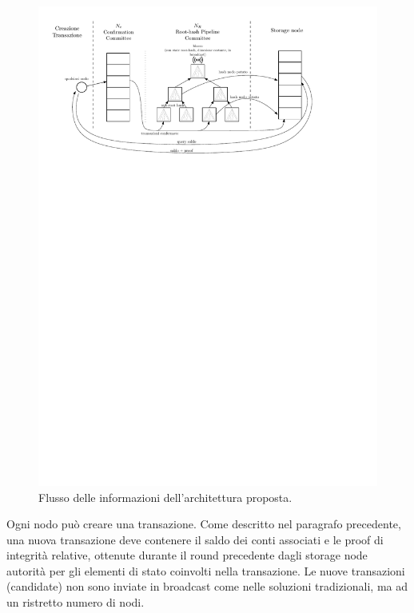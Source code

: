 \begin{figure}
	\centering
	\includegraphics[scale=0.82]{img/captre/bc.pdf}
	\caption{Flusso delle informazioni dell'architettura proposta.}
	\label{fig:architecture}
\end{figure}

Ogni nodo può creare una transazione. Come descritto nel paragrafo precedente, una nuova transazione deve contenere il saldo dei conti associati e le proof di integrità relative, ottenute durante il round precedente dagli storage node autorità per gli elementi di stato coinvolti nella transazione. Le nuove transazioni (candidate) non sono inviate in broadcast come nelle soluzioni tradizionali, ma ad un ristretto numero di nodi.

